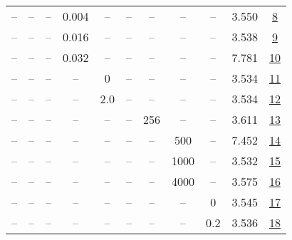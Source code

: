 \begin{table}[H]
\begin{tabular}{ccccccccccc}
-- & -- & -- & 0.004 & -- & -- & -- & -- & -- & 3.550 & \href{https://wandb.ai/stanford-mercury/optimizer-scaling/runs/sweep-130m-2B-adamw79cde5lr0.004-wd0.1-minlr0-warmup2000-b10.9-b-019ae3}{8} \\
-- & -- & -- & 0.016 & -- & -- & -- & -- & -- & 3.538 & \href{https://wandb.ai/stanford-mercury/optimizer-scaling/runs/sweep-130m-2B-adamw5f56aalr0.016-wd0.1-minlr0-warmup2000-b10.9-b-9972d1}{9} \\
-- & -- & -- & 0.032 & -- & -- & -- & -- & -- & 7.781 & \href{https://wandb.ai/stanford-mercury/optimizer-scaling/runs/sweep-130m-2B-adamw73dd8elr0.032-wd0.1-minlr0-warmup2000-b10.9-b-d0f554}{10} \\
-- & -- & -- & -- & 0 & -- & -- & -- & -- & 3.534 & \href{https://wandb.ai/stanford-mercury/optimizer-scaling/runs/sweep-130m-2B-adamw3f4574lr0.008-wd0.1-minlr0-warmup2000-b10.9-b-266a88}{11} \\
-- & -- & -- & -- & 2.0 & -- & -- & -- & -- & 3.534 & \href{https://wandb.ai/stanford-mercury/optimizer-scaling/runs/sweep-130m-2B-adamw30a624lr0.008-wd0.1-minlr0-warmup2000-b10.9-b-c09e98}{12} \\
-- & -- & -- & -- & -- & -- & 256 & -- & -- & 3.611 & \href{https://wandb.ai/stanford-mercury/optimizer-scaling/runs/sweep-130m-2B-adamw7fa927lr0.008-wd0.1-minlr0-warmup2000-b10.9-b-8cb11e}{13} \\
-- & -- & -- & -- & -- & -- & -- & 500 & -- & 7.452 & \href{https://wandb.ai/stanford-mercury/optimizer-scaling/runs/sweep-130m-2B-adamw20884flr0.008-wd0.1-minlr0-warmup500-b10.9-b2-819ba9}{14} \\
-- & -- & -- & -- & -- & -- & -- & 1000 & -- & 3.532 & \href{https://wandb.ai/stanford-mercury/optimizer-scaling/runs/sweep-130m-2B-adamwe4d6f6lr0.008-wd0.1-minlr0-warmup1000-b10.9-b-d51a10}{15} \\
-- & -- & -- & -- & -- & -- & -- & 4000 & -- & 3.575 & \href{https://wandb.ai/stanford-mercury/optimizer-scaling/runs/sweep-130m-2B-adamw6afe2alr0.008-wd0.1-minlr0-warmup4000-b10.9-b-cff12f}{16} \\
-- & -- & -- & -- & -- & -- & -- & -- & 0 & 3.545 & \href{https://wandb.ai/stanford-mercury/optimizer-scaling/runs/sweep-130m-2B-adamweb4f13lr0.008-wd0-minlr0-warmup2000-b10.9-b20-f7fd96}{17} \\
-- & -- & -- & -- & -- & -- & -- & -- & 0.2 & 3.536 & \href{https://wandb.ai/stanford-mercury/optimizer-scaling/runs/sweep-130m-2B-adamw2f8ed9lr0.008-wd0.2-minlr0-warmup2000-b10.9-b-f4d5cf}{18} \\
\bottomrule
\end{tabular}
\end{table}

